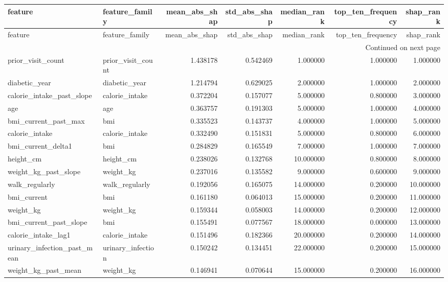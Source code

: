 \begin{longtable}{llrrrrr}
\toprule
feature & feature\_family & mean\_abs\_shap & std\_abs\_shap & median\_rank & top\_ten\_frequency & shap\_rank \\
\midrule
\endfirsthead
\toprule
feature & feature\_family & mean\_abs\_shap & std\_abs\_shap & median\_rank & top\_ten\_frequency & shap\_rank \\
\midrule
\endhead
\midrule
\multicolumn{7}{r}{Continued on next page} \\
\midrule
\endfoot
\bottomrule
\endlastfoot
prior\_visit\_count & prior\_visit\_count & 1.438178 & 0.542469 & 1.000000 & 1.000000 & 1.000000 \\
diabetic\_year & diabetic\_year & 1.214794 & 0.629025 & 2.000000 & 1.000000 & 2.000000 \\
calorie\_intake\_past\_slope & calorie\_intake & 0.372204 & 0.157077 & 5.000000 & 0.800000 & 3.000000 \\
age & age & 0.363757 & 0.191303 & 5.000000 & 1.000000 & 4.000000 \\
bmi\_current\_past\_max & bmi & 0.335523 & 0.143737 & 4.000000 & 1.000000 & 5.000000 \\
calorie\_intake & calorie\_intake & 0.332490 & 0.151831 & 5.000000 & 0.800000 & 6.000000 \\
bmi\_current\_delta1 & bmi & 0.284829 & 0.165549 & 7.000000 & 1.000000 & 7.000000 \\
height\_cm & height\_cm & 0.238026 & 0.132768 & 10.000000 & 0.800000 & 8.000000 \\
weight\_kg\_past\_slope & weight\_kg & 0.237016 & 0.135582 & 9.000000 & 0.600000 & 9.000000 \\
walk\_regularly & walk\_regularly & 0.192056 & 0.165075 & 14.000000 & 0.200000 & 10.000000 \\
bmi\_current & bmi & 0.161180 & 0.064013 & 15.000000 & 0.200000 & 11.000000 \\
weight\_kg & weight\_kg & 0.159344 & 0.058003 & 14.000000 & 0.200000 & 12.000000 \\
bmi\_current\_past\_slope & bmi & 0.155491 & 0.077567 & 18.000000 & 0.000000 & 13.000000 \\
calorie\_intake\_lag1 & calorie\_intake & 0.151496 & 0.182366 & 20.000000 & 0.200000 & 14.000000 \\
urinary\_infection\_past\_mean & urinary\_infection & 0.150242 & 0.134451 & 22.000000 & 0.200000 & 15.000000 \\
weight\_kg\_past\_mean & weight\_kg & 0.146941 & 0.070644 & 15.000000 & 0.200000 & 16.000000 \\

\end{longtable}
